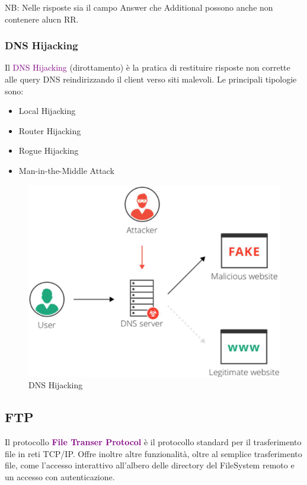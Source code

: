 NB: Nelle risposte sia il campo Answer che Additional possono anche non contenere alucn RR.

\subsubsection{DNS Hijacking}
Il \textcolor{purple}{DNS Hijacking} (dirottamento) è la pratica di restituire risposte non corrette alle query DNS reindirizzando il client verso siti malevoli.
Le principali tipologie sono:
\begin{itemize}
    \item Local Hijacking
    \item Router Hijacking
    \item Rogue Hijacking
    \item Man-in-the-Middle Attack
\end{itemize}
\begin{figure}[h]
    \centering
    \includegraphics[scale=0.35]{Immagini/DNS_Hijacking.png}
    \caption{DNS Hijacking}
\end{figure}

\newpage

\subsection{FTP}
Il protocollo \textbf{\textcolor{purple}{File Transer Protocol}} è il protocollo standard per il trasferimento file in reti TCP/IP. Offre inoltre altre funzionalità, oltre al semplice trasferimento file, come l'accesso interattivo all'albero delle directory del FileSystem remoto e un accesso con autenticazione.

